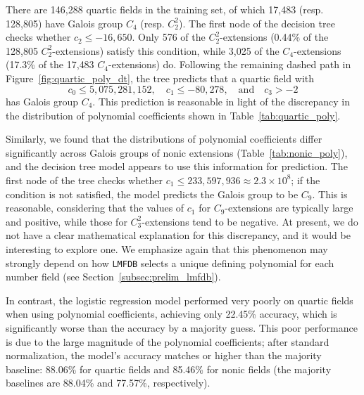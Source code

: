 \documentclass[letterpaper, 10pt]{article}
\newcommand{\1}{\mathds{1}}	%
\theoremstyle{definition}
\theoremstyle{remark}
\begin{document}
There are 146{,}288 quartic fields in the training set, of which 17{,}483 (resp. 128{,}805) have Galois group \( C_4 \) (resp. \( C_2^2 \)).  
The first node of the decision tree checks whether \( c_2 \le -16{,}650 \).  
Only 576 of the \( C_2^2 \)-extensions (0.44\% of the 128{,}805 \( C_2^2 \)-extensions) satisfy this condition, while 3{,}025 of the \( C_4 \)-extensions (17.3\% of the 17{,}483 \( C_4 \)-extensions) do.
Following the remaining dashed path in Figure~\ref{fig:quartic_poly_dt}, the tree predicts that a quartic field with   \[ c_0 \le 5{,}075{,}281{,}152, \quad c_1 \le -80{,}278, \quad \text{and} \quad c_3 > -2 \]
has Galois group \( C_4 \).  
This prediction is reasonable in light of the discrepancy in the distribution of polynomial coefficients shown in Table~\ref{tab:quartic_poly}.

Similarly, we found that the distributions of polynomial coefficients differ significantly across Galois groups of nonic extensions (Table~\ref{tab:nonic_poly}), and the decision tree model appears to use this information for prediction.   The first node of the tree checks whether \( c_1 \le 233{,}597{,}936 \approx 2.3 \times 10^8 \); if the condition is not satisfied, the model predicts the Galois group to be \( C_9 \).   This is reasonable, considering that the values of \( c_1 \) for \( C_9 \)-extensions are typically large and positive, while those for \( C_3^2 \)-extensions tend to be negative.
At present, we do not have a clear mathematical explanation for this discrepancy, and it would be interesting to explore one.  
We emphasize again that this phenomenon may strongly depend on how \texttt{LMFDB} selects a unique defining polynomial for each number field (see Section~\ref{subsec:prelim_lmfdb}).

In contrast, the logistic regression model performed very poorly on quartic fields when using polynomial coefficients, achieving only  22.45\% accuracy, which is significantly worse than the accuracy by a majority guess. This poor performance is due to the large magnitude of the polynomial coefficients; after standard normalization, the model's accuracy matches or higher than the  majority baseline:  88.06\% for quartic fields and  85.46\% for nonic fields (the majority baselines are 88.04\% and 77.57\%, respectively).
\end{document}
